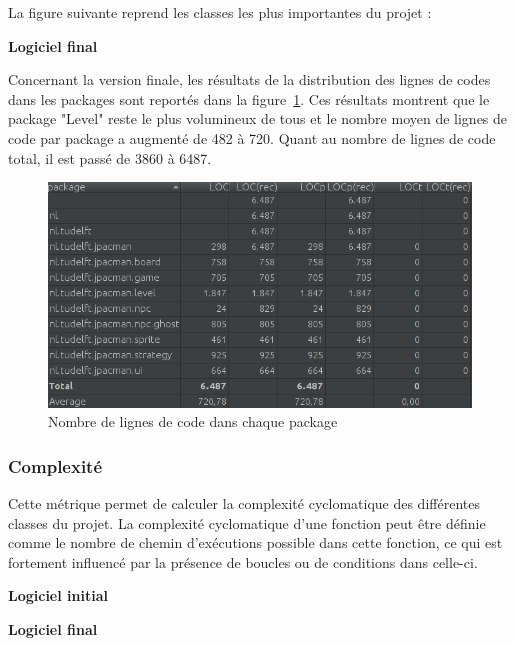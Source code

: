 \documentclass[12pt, openany]{report}
\begin{document}
La figure suivante reprend les classes les plus importantes du projet :



\newpage




\textbf{Logiciel final}

Concernant la version finale, les résultats de la distribution des lignes de codes dans les packages sont reportés dans la figure~\ref{locfinal}. Ces résultats montrent que le package "Level" reste le plus volumineux de tous et le nombre moyen de lignes de code par package a augmenté de 482 à 720. Quant au nombre de lignes de code total, il est passé de 3860 à 6487.

\begin{figure}[!h]
	\centering
	\includegraphics[scale=0.6]{Images/SizeMetricsLOCFinal.png} 
	\caption{Nombre de lignes de code dans chaque package}
	\label{locfinal}
\end{figure}



\subsubsection*{Complexité}

Cette métrique permet de calculer la complexité cyclomatique des différentes classes du projet. La complexité cyclomatique d'une fonction peut être définie comme le nombre de chemin d'exécutions possible dans cette fonction, ce qui est fortement influencé par la présence de boucles ou de conditions dans celle-ci.

\textbf{Logiciel initial}

\textbf{Logiciel final}


\end{document}
